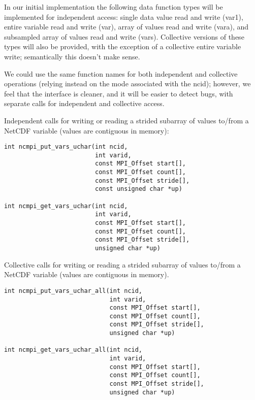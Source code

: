 \documentclass[10pt]{article}
\begin{document}
In our initial implementation the following data function types will be
implemented for independent access: single data value read and write (var1),
entire variable read and write (var), array of values read and write (vara),
and subsampled array of values read and write (vars).  Collective versions of
these types will also be provided, with the exception of a collective entire
variable write; semantically this doesn't make sense.

We could use the same function names for both independent and collective
operations (relying instead on the mode associated with the ncid); however, we
feel that the interface is cleaner, and it will be easier to detect bugs, with
separate calls for independent and collective access.

%
Independent calls for writing or reading a strided subarray of values to/from
a NetCDF variable (values are contiguous in memory):
\begin{verbatim}
int ncmpi_put_vars_uchar(int ncid,
                         int varid,
                         const MPI_Offset start[],
                         const MPI_Offset count[],
                         const MPI_Offset stride[],
                         const unsigned char *up)

int ncmpi_get_vars_uchar(int ncid,
                         int varid,
                         const MPI_Offset start[],
                         const MPI_Offset count[],
                         const MPI_Offset stride[],
                         unsigned char *up)
\end{verbatim}

Collective calls for writing or reading a strided subarray of values to/from a
NetCDF variable (values are contiguous in memory).
\begin{verbatim}
int ncmpi_put_vars_uchar_all(int ncid,
                             int varid,
                             const MPI_Offset start[],
                             const MPI_Offset count[],
                             const MPI_Offset stride[],
                             unsigned char *up)

int ncmpi_get_vars_uchar_all(int ncid,
                             int varid,
                             const MPI_Offset start[],
                             const MPI_Offset count[],
                             const MPI_Offset stride[],
                             unsigned char *up)
\end{verbatim}
\end{document}
